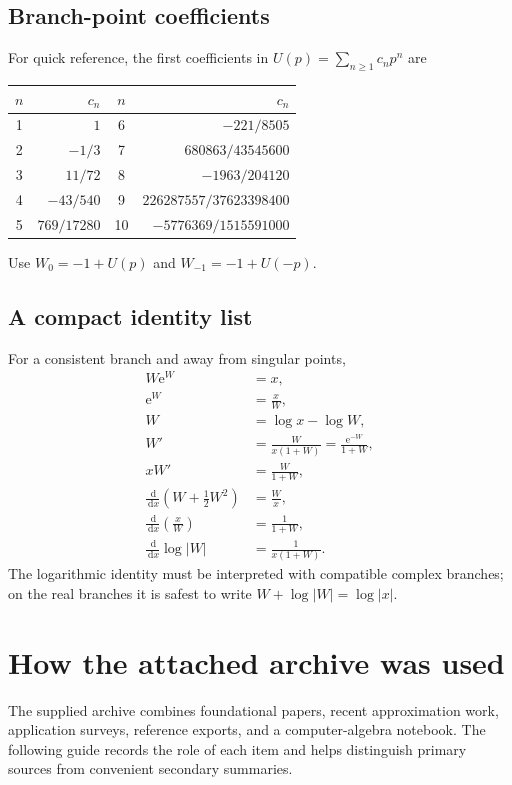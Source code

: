 \documentclass[11pt,openany]{book}
\newcommand{\e}{\mathrm{e}}
\newcommand{\dd}{\,\mathrm{d}}
\newcommand{\abs}[1]{\left|#1\right|}
\theoremstyle{plain}
\theoremstyle{definition}
\theoremstyle{remark}
\begin{document}
\section{Branch-point coefficients}
For quick reference, the first coefficients in
\(U(p)=\sum_{n\ge1}c_np^n\) are
\begin{center}
\begin{tabular}{@{}crcr@{}}
\toprule
\(n\) & \(c_n\) & \(n\) & \(c_n\) \\
\midrule
1 & \(1\) & 6 & \(-221/8505\) \\
2 & \(-1/3\) & 7 & \(680863/43545600\) \\
3 & \(11/72\) & 8 & \(-1963/204120\) \\
4 & \(-43/540\) & 9 & \(226287557/37623398400\) \\
5 & \(769/17280\) & 10 & \(-5776369/1515591000\) \\
\bottomrule
\end{tabular}
\end{center}
Use \(W_0=-1+U(p)\) and \(W_{-1}=-1+U(-p)\).

\section{A compact identity list}
For a consistent branch and away from singular points,
\begin{align*}
 W\e^W&=x,\\
 \e^W&=\frac{x}{W},\\
 W&=\log x-\log W,\\
 W'&=\frac{W}{x(1+W)}=\frac{\e^{-W}}{1+W},\\
 xW'&=\frac{W}{1+W},\\
 \frac{\dd}{\dd x}\left(W+\frac12W^2\right)&=\frac{W}{x},\\
 \frac{\dd}{\dd x}\left(\frac{x}{W}\right)&=\frac1{1+W},\\
 \frac{\dd}{\dd x}\log\abs W&=\frac1{x(1+W)}.
\end{align*}
The logarithmic identity must be interpreted with compatible complex branches;
on the real branches it is safest to write
\(W+\log\abs W=\log\abs x\).

\chapter{How the attached archive was used}\label{app:archive}

The supplied archive combines foundational papers, recent approximation work,
application surveys, reference exports, and a computer-algebra notebook.  The
following guide records the role of each item and helps distinguish primary
sources from convenient secondary summaries.
\end{document}

